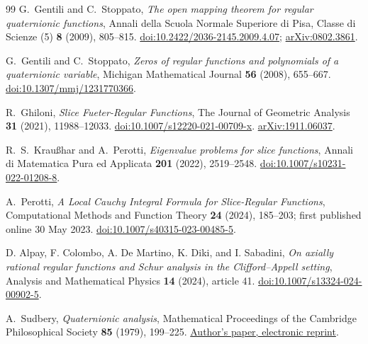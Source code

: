 \documentclass[11pt,a4paper]{article}
\numberwithin{equation}{section}
\theoremstyle{definition}
\theoremstyle{remark}
\theoremstyle{plain}
\begin{document}
\begin{thebibliography}{99}
G.~Gentili and C.~Stoppato, \emph{The open mapping theorem for regular quaternionic functions}, Annali della Scuola Normale Superiore di Pisa, Classe di Scienze (5) \textbf{8} (2009), 805--815. \href{https://doi.org/10.2422/2036-2145.2009.4.07}{doi:10.2422/2036-2145.2009.4.07}; \href{https://arxiv.org/abs/0802.3861}{arXiv:0802.3861}.

G.~Gentili and C.~Stoppato, \emph{Zeros of regular functions and polynomials of a quaternionic variable}, Michigan Mathematical Journal \textbf{56} (2008), 655--667. \href{https://doi.org/10.1307/mmj/1231770366}{doi:10.1307/mmj/1231770366}.

R.~Ghiloni, \emph{Slice Fueter-Regular Functions}, The Journal of Geometric Analysis \textbf{31} (2021), 11988--12033. \href{https://doi.org/10.1007/s12220-021-00709-x}{doi:10.1007/s12220-021-00709-x}. \href{https://arxiv.org/abs/1911.06037}{arXiv:1911.06037}.

R.~S.~Krau\ss har and A.~Perotti, \emph{Eigenvalue problems for slice functions}, Annali di Matematica Pura ed Applicata \textbf{201} (2022), 2519--2548. \href{https://doi.org/10.1007/s10231-022-01208-8}{doi:10.1007/s10231-022-01208-8}.

A.~Perotti, \emph{A Local Cauchy Integral Formula for Slice-Regular Functions}, Computational Methods and Function Theory \textbf{24} (2024), 185--203; first published online 30 May 2023. \href{https://doi.org/10.1007/s40315-023-00485-5}{doi:10.1007/s40315-023-00485-5}.

D. Alpay, F. Colombo, A. De Martino, K. Diki, and I. Sabadini, \emph{On axially rational regular functions and Schur analysis in the Clifford--Appell setting}, Analysis and Mathematical Physics \textbf{14} (2024), article 41. \href{https://doi.org/10.1007/s13324-024-00902-5}{doi:10.1007/s13324-024-00902-5}.

A.~Sudbery, \emph{Quaternionic analysis}, Mathematical Proceedings of the Cambridge Philosophical Society \textbf{85} (1979), 199--225. \href{https://dougsweetser.github.io/Q/Stuff/pdfs/Quaternionic-analysis.pdf}{Author's paper, electronic reprint}.

\end{thebibliography}
\end{document}
